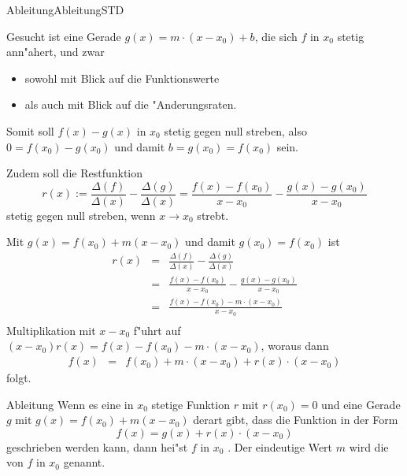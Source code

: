 \begin{MXContent}{Ableitung}{Ableitung}{STD}

Gesucht ist eine Gerade $g(x) = m \cdot (x - x_0) + b$, die sich $f$ in $x_0$ 
stetig ann"ahert, und zwar
\begin{itemize}
\item sowohl mit Blick auf die Funktionswerte
\item als auch mit Blick auf die "Anderungsraten.
\end{itemize}

Somit soll $f(x) - g(x)$ in $x_0$ stetig gegen null streben, also
$0 = f(x_0) - g(x_0)$ und damit $b = g(x_0) = f(x_0)$ sein.

Zudem soll die Restfunktion
\[
r(x) := \frac{\Delta(f)}{\Delta(x)} - \frac{\Delta(g)}{\Delta(x)} %
 = \frac{f(x) - f(x_0)}{x - x_0} - \frac{g(x) - g(x_0)}{x - x_0} %
\]
stetig gegen null streben, wenn $x \to x_0$ strebt.

Mit $g(x) = f(x_0) + m (x - x_0)$ und damit $g(x_0) = f(x_0)$ ist
\begin{eqnarray*}
r(x) & = & \frac{\Delta(f)}{\Delta(x)} - \frac{\Delta(g)}{\Delta(x)} \\
 & = & \frac{f(x) - f(x_0)}{x - x_0} - \frac{g(x) - g(x_0)}{x - x_0} \\
 & = & \frac{f(x) - f(x_0) - m \cdot (x - x_0)}{x - x_0} \\
\end{eqnarray*}
Multiplikation mit $x - x_0$ f"uhrt auf
$(x - x_0) r(x) = f(x) - f(x_0) - m \cdot (x - x_0)$, 
woraus dann %
\begin{eqnarray*}
f(x) & = & f(x_0) + m \cdot (x - x_0) + r(x) \cdot (x - x_0) %
\end{eqnarray*}
folgt.

\begin{MXInfo}{Ableitung}
Wenn es eine in $x_0$ stetige Funktion $r$ mit $r(x_0) = 0$ und eine Gerade 
$g$ mit $g(x) = f(x_0) + m (x - x_0)$ derart gibt, dass die Funktion
in der Form
\[
f(x) = g(x) + r(x) \cdot (x - x_0)
\]
geschrieben werden kann,
dann hei"st $f$ in $x_0$ . 
Der eindeutige Wert $m$ wird die  
von $f$ in $x_0$ genannt.
\end{MXInfo}


\end{MXContent}
